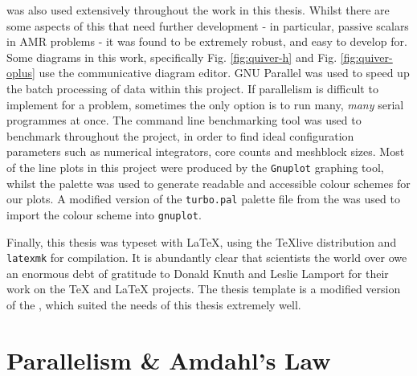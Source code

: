 \noindent
\athena{} \parencite{athena} was also used extensively throughout the work in this thesis.
Whilst there are some aspects of this that need further development - in particular, passive scalars in AMR problems - it was found to be extremely robust, and easy to develop for.
Some diagrams in this work, specifically Fig. \ref{fig:quiver-h} and Fig. \ref{fig:quiver-oplus} use the  communicative diagram editor.
GNU Parallel \parencite{tange_2021_5523272} was used to speed up the batch processing of data within this project.
If parallelism is difficult to implement for a problem, sometimes the only option is to run many, \textit{many} serial programmes at once.
The  command line benchmarking tool was used to benchmark \athena{} throughout the project, in order to find ideal configuration parameters such as numerical integrators, core counts and meshblock sizes.
Most of the line plots in this project were produced by the \texttt{Gnuplot} graphing tool, whilst the  palette was used to generate readable and accessible colour schemes for our plots.
A modified version of the \texttt{turbo.pal} palette file from the  was used to import the colour scheme into \texttt{gnuplot}.

Finally, this thesis was typeset with \LaTeX{}, using the {\TeX}live distribution and \texttt{latexmk} for compilation.
It is abundantly clear that scientists the world over owe an enormous debt of gratitude to Donald Knuth and Leslie Lamport for their work on the \TeX{} and \LaTeX{} projects.
The thesis template is a modified version of the , which suited the needs of this thesis extremely well.

\section{Parallelism \& Amdahl's Law}
\label{app:parallelism}

